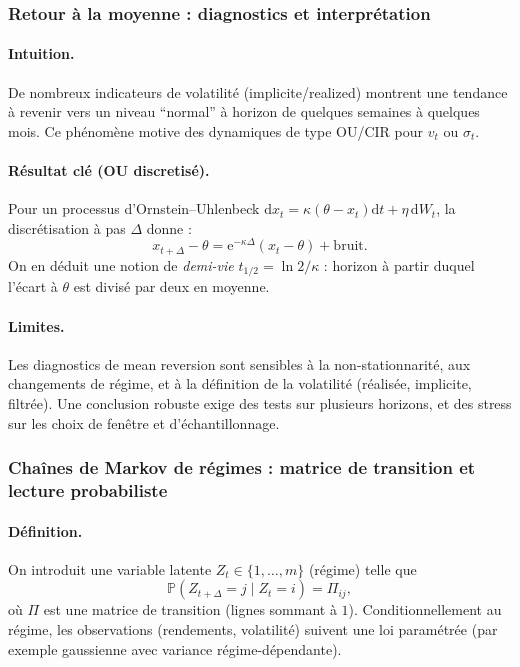\documentclass[11pt,a4paper]{article}
\newcommand{\dd}{\mathrm{d}}
\newcommand{\ee}{\mathrm{e}}
\newcommand{\PP}{\mathbb{P}}
\newcommand{\1}{\mathbf{1}}
\begin{document}
\subsubsection{Retour \`a la moyenne : diagnostics et interpr\'etation}

\paragraph{Intuition.}
De nombreux indicateurs de volatilité (implicite/realized) montrent une tendance \`a revenir vers un niveau ``normal'' \`a horizon
de quelques semaines \`a quelques mois. Ce ph\'enom\`ene motive des dynamiques de type OU/CIR pour $v_t$ ou $\sigma_t$.

\paragraph{R\'esultat cl\'e (OU discretis\'e).}
Pour un processus d'Ornstein--Uhlenbeck $\dd x_t=\kappa(\theta-x_t)\dd t + \eta\,\dd W_t$, la discr\'etisation \`a pas $\Delta$ donne :
\[
x_{t+\Delta}-\theta = \ee^{-\kappa\Delta}(x_t-\theta) + \text{bruit}.
\]
On en d\'eduit une notion de \emph{demi-vie} $t_{1/2}=\ln 2/\kappa$ : horizon \`a partir duquel l'\'ecart \`a $\theta$ est divis\'e par deux en moyenne.

\paragraph{Limites.}
Les diagnostics de mean reversion sont sensibles \`a la non-stationnarit\'e, aux changements de r\'egime, et \`a la d\'efinition
de la volatilité (r\'ealis\'ee, implicite, filtr\'ee). Une conclusion robuste exige des tests sur plusieurs horizons, et des stress
sur les choix de fen\^etre et d'\'echantillonnage.

\subsubsection{Cha\^ines de Markov de r\'egimes : matrice de transition et lecture probabiliste}

\paragraph{D\'efinition.}
On introduit une variable latente $Z_t\in\{1,\dots,m\}$ (r\'egime) telle que
\[
\PP(Z_{t+\Delta}=j \mid Z_t=i)=\Pi_{ij},
\]
o\`u $\Pi$ est une matrice de transition (lignes sommant \`a $1$). Conditionnellement au r\'egime, les observations (rendements, volatilité)
suivent une loi param\'etr\'ee (par exemple gaussienne avec variance r\'egime-d\'ependante).
\end{document}
